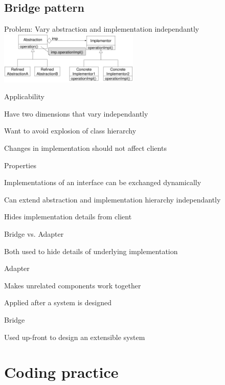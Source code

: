 \documentclass[10pt]{article}
\begin{document}
\subsection{Bridge pattern}
\enumstart
	\item Problem: Vary abstraction and implementation independantly
	\\ \includegraphics[width=0.5\textwidth]{bridge_pattern.png}
	\item Applicability
	\enumstart
		\item Have two dimensions that vary independantly
		\item Want to avoid explosion of class hierarchy
		\item Changes in implementation should not affect clients
	\enumend
	\item Properties
	\enumstart
		\item Implementations of an interface can be exchanged dynamically
		\item Can extend abstraction and implementation hierarchy independantly
		\item Hides implementation details from client
	\enumend
	\item Bridge vs. Adapter
	\enumstart
		\item Both used to hide details of underlying implementation
		\item Adapter
		\enumstart
			\item Makes unrelated components work together
			\item Applied after a system is designed
		\enumend
		\item Bridge
		\enumstart
			\item Used up-front to design an extensible system
		\enumend
	\enumend
\enumend

\section{Coding practice}
\end{document}
